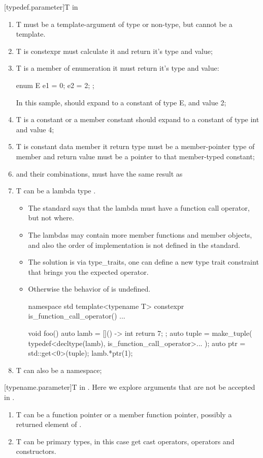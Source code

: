 [typedef.parameter]{T in  } 
\begin{enumerate}
\item T must be a template-argument of type or non-type, but cannot be a template.
\item T is constexpr  must calculate it and return it's type and value;
\item T is a member of enumeration it must return it's type and value:
\begin{codeblock}
enum E {
  e1 = 0;
  e2 = 2;
};
\end{codeblock}
In this sample,  should expand to a constant of type E, and value 2;
\item T is a constant or a member constant  should expand to a constant of type int and value 4;
\item T is constant data member it return type must be a member-pointer type of member and return value must be a pointer to that member-typed constant;
\item {} and their combinations, must have the same result as 
\item T can be a lambda type .
\begin{itemize}
\item The standard says that the lambda must have a function call operator, but not where.
\item The lambdas may contain more member functions and member objects, and also the order of implementation is not defined in the standard.
\item The solution is via type_traits, one can define a new type trait  constraint that brings you the expected operator.
\item Otherwise the behavior of  is undefined.
\begin{codeblock}
namespace std {
 template<typename T>
 constexpr is_function_call_operator() {...} 
}

void foo() {
 auto lamb = []() -> int { return 7; };
 auto tuple = make_tuple( typedef<decltype(lamb), is_function_call_operator>... );
 auto ptr = std::get<0>(tuple);
 lamb.*ptr(1);
}
\end{codeblock}
\end{itemize}
\item T can also be a namespace;
\end{enumerate}

[typename.parameter]{T in  }.
Here we explore arguments that are not be accepted in . 
\begin{enumerate}
\item T can be a function pointer or a member function pointer, possibly a returned element of . 
\item T can be primary types, in this case  get cast operators, operators and constructors.
\end{enumerate}
